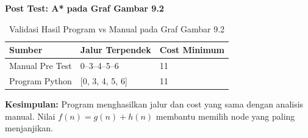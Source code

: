 \textbf{Post Test: A* pada Graf Gambar 9.2}
\begin{table}[H]
    \centering
    \caption{Validasi Hasil Program vs Manual pada Graf Gambar 9.2}
    \label{tab:praktikum9-validasi-posttest}
    \begin{tabular}{lll}
    \toprule
    \textbf{Sumber} & \textbf{Jalur Terpendek} & \textbf{Cost Minimum} \\ \midrule
    Manual Pre Test & 0--3--4--5--6 & 11 \\
    Program Python & [0, 3, 4, 5, 6] & 11 \\ \bottomrule
    \end{tabular}
\end{table}

\textbf{Kesimpulan:} Program menghasilkan jalur dan cost yang sama dengan analisis manual. Nilai $f(n)=g(n)+h(n)$ membantu memilih node yang paling menjanjikan.
